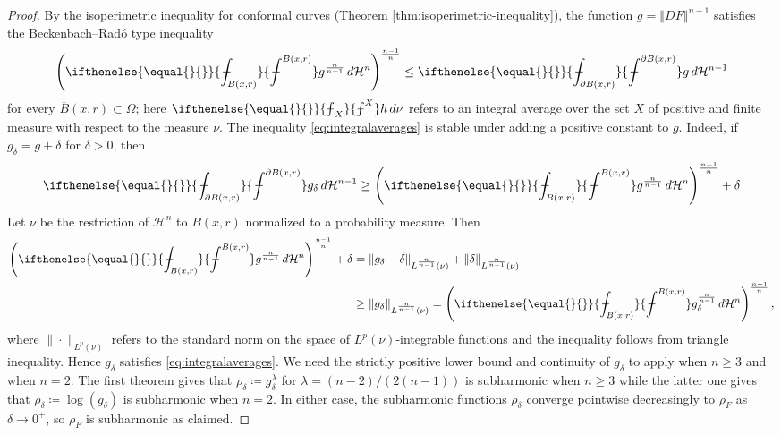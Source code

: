 \documentclass[a4paper,leqno,11pt]{amsart}
\numberwithin{equation}{section}
\theoremstyle{remark}
\theoremstyle{remark}
\newcommand{\norm}[1]{ \left\Vert #1 \right\Vert }	%
\newcommand{\aint}[2][]{%
	\ifthenelse{\equal{#1}{}}%
					{%
\mathchoice%
      {\mathop{\kern 0.2em\vrule width 0.6em height 0.69678ex depth -0.58065ex
              \kern -0.8em \intop}\nolimits_{\kern -0.45em#2}^{#1}}%
      {\mathop{\kern 0.1em\vrule width 0.5em height 0.69678ex depth -0.60387ex
              \kern -0.6em \intop}\nolimits_{#2}^{#1}}%
      {\mathop{\kern 0.1em\vrule width 0.5em height 0.69678ex depth -0.60387ex
              \kern -0.6em \intop}\nolimits_{#2}^{#1}}%
      {\mathop{\kern 0.1em\vrule width 0.5em height 0.69678ex depth -0.60387ex
              \kern -0.6em \intop}\nolimits_{#2}^{#1}}}%
					{%
\mathchoice%
      {\mathop{\kern 0.2em\vrule width 0.6em height 0.69678ex depth -0.58065ex                                              
              \kern -0.8em \intop}\nolimits_{\kern -0.45em#1}^{#2}}%
      {\mathop{\kern 0.1em\vrule width 0.5em height 0.69678ex depth -0.60387ex
              \kern -0.6em \intop}\nolimits_{#1}^{#2}}%
      {\mathop{\kern 0.1em\vrule width 0.5em height 0.69678ex depth -0.60387ex
              \kern -0.6em \intop}\nolimits_{#1}^{#2}}%
      {\mathop{\kern 0.1em\vrule width 0.5em height 0.69678ex depth -0.60387ex
              \kern -0.6em \intop}\nolimits_{#1}^{#2}}}}
\begin{document}
\begin{proof}
By the isoperimetric inequality for conformal curves (Theorem \ref{thm:isoperimetric-inequality}), the function $g = \norm{DF}^{n-1}$ satisfies the Beckenbach--Radó type inequality
\begin{equation}\label{eq:integralaverages}
    \left(
    \aint{ B( x, r ) }
        g^{ \frac{n}{n-1} }
    \,d\mathcal{H}^n
    \right)^{ \frac{n-1}{n} }
    \leq
    \aint{ \partial B(x,r) } g \,d\mathcal{H}^{n-1}
\end{equation}
for every $\overline{B}(x,r) \subset \Omega$; here $\aint{X} h \,d\nu$ refers to an integral average over the set $X$ of positive and finite measure with respect to the measure $\nu$. The inequality \eqref{eq:integralaverages} is stable under adding a positive constant to $g$. Indeed, if $g_\delta = g + \delta$ for $\delta > 0$, then
\begin{align*}
    \aint{ \partial B(x,r) } g_\delta \,d\mathcal{H}^{n-1}
    \geq
    \left( \aint{ B(x,r) } g^{ \frac{n}{n-1} } \,d\mathcal{H}^{n} \right)^{ \frac{n-1}{n} }
    +
    \delta
\end{align*}
Let $\nu$ be the restriction of $\mathcal H^n$ to $B(x,r)$ normalized to a probability measure. Then
\begin{align*}
    \left( \aint{ B(x,r) } g^{ \frac{n}{n-1} } \,d\mathcal{H}^{n} \right)^{ \frac{n-1}{n} }
    +
    \delta
    &=
    \| g_\delta - \delta \|_{ L^{ \frac{n}{n-1} }(\nu) }
    +
    \| \delta \|_{ L^{\frac{n}{n-1}}( \nu ) }
    \\
    &\geq
    \| g_\delta \|_{ L^{\frac{n}{n-1}}(\nu) }
    =
    \left( \aint{ B(x,r) } g^{ \frac{n}{n-1} }_\delta \,d\mathcal{H}^{n} \right)^{ \frac{n-1}{n} },
\end{align*}
where $\| \cdot \|_{ L^{p}( \nu ) }$ refers to the standard norm on the space of $L^{p}(\nu)$-integrable functions and the inequality follows from triangle inequality. Hence $g_\delta$ satisfies \eqref{eq:integralaverages}. We need the strictly positive lower bound and continuity of $g_\delta$ to apply \cite[Theorem 3.21 (i)]{Ekon:02} when $n \geq 3$ and \cite[Theorem 2.13. (ii)]{Ekon:02} when $n = 2$. The first theorem gives that $\rho_\delta \coloneqq g_\delta^{ \lambda }$ for $\lambda = (n-2)/(2(n-1))$ is subharmonic when $n \geq 3$ while the latter one gives that $\rho_\delta \coloneqq \log( g_\delta )$ is subharmonic when $n =2$. In either case, the subharmonic functions $\rho_\delta$ converge pointwise decreasingly to $\rho_F$ as $\delta \rightarrow 0^{+}$, so $\rho_F$ is subharmonic as claimed.
\end{proof}
\end{document}
